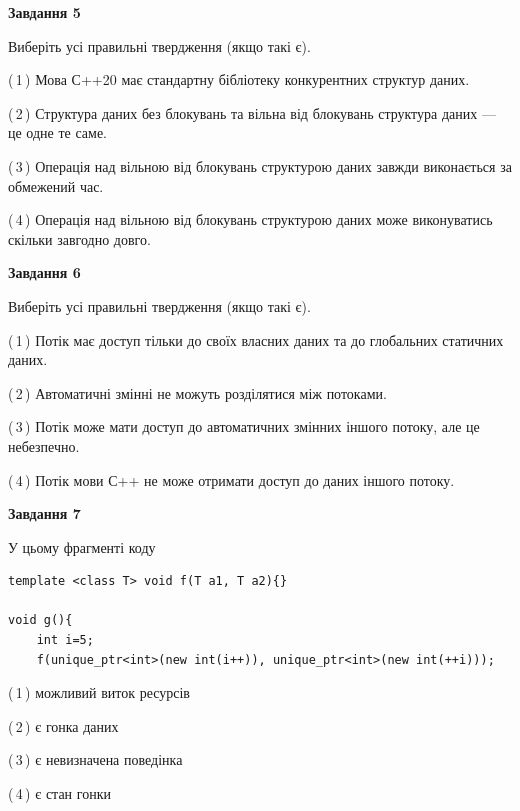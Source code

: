 \documentclass[12pt, ukrainian]{article}
\begin{document}
\begin {large}
{\begin{center}
\textbf{Завдання 5}
\end{center}

Виберіть усі правильні твердження (якщо такі є).\par
\vspace{2mm}

(\,1\,) Мова С++20 має стандартну бібліотеку конкурентних структур даних.%

(\,2\,) Структура даних без блокувань та вільна від блокувань структура даних --- це одне те саме.%

(\,3\,) Операція над вільною від блокувань структурою даних завжди виконається за обмежений час.%

(\,4\,) Операція над вільною від блокувань структурою даних може виконуватись скільки завгодно довго.%
\newpage


\begin{center}
\textbf{Завдання 6}
\end{center}

Виберіть усі правильні твердження (якщо такі є).\par
\vspace{2mm}

(\,1\,) Потік має доступ тільки до своїх власних даних та до глобальних статичних даних.%

(\,2\,) Автоматичні змінні не можуть розділятися між потоками.%

(\,3\,) Потік може мати доступ до автоматичних змінних іншого потоку, але це небезпечно.%

(\,4\,) Потік мови С++ не може отримати доступ до даних іншого потоку.%


\begin{center}
\textbf{Завдання 7}
\end{center}

У цьому фрагменті коду
\begin{verbatim}
template <class T> void f(T a1, T a2){}

void g(){
    int i=5;
    f(unique_ptr<int>(new int(i++)), unique_ptr<int>(new int(++i)));
\end{verbatim}

(\,1\,) можливий виток ресурсів%

(\,2\,) є гонка даних%

(\,3\,) є невизначена поведінка%

(\,4\,) є стан гонки%

}
\end {large}

\vspace{4mm}
\newpage
\end{document}
